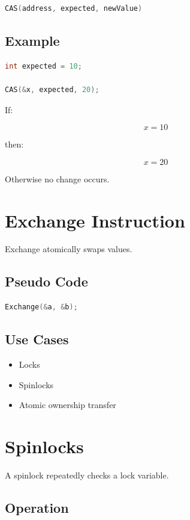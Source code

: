 \begin{lstlisting}[language=C++,style=interviewcode]
CAS(address, expected, newValue)
\end{lstlisting}

\subsection{Example}

\begin{lstlisting}[language=C++,style=interviewcode]
int expected = 10;

CAS(&x, expected, 20);
\end{lstlisting}

If:

\[
x = 10
\]

then:

\[
x = 20
\]

Otherwise no change occurs.

\section{Exchange Instruction}

Exchange atomically swaps values.

\subsection{Pseudo Code}

\begin{lstlisting}[language=C++,style=interviewcode]
Exchange(&a, &b);
\end{lstlisting}

\subsection{Use Cases}

\begin{itemize}
\item Locks
\item Spinlocks
\item Atomic ownership transfer
\end{itemize}

\section{Spinlocks}

A spinlock repeatedly checks a lock variable.

\subsection{Operation}

